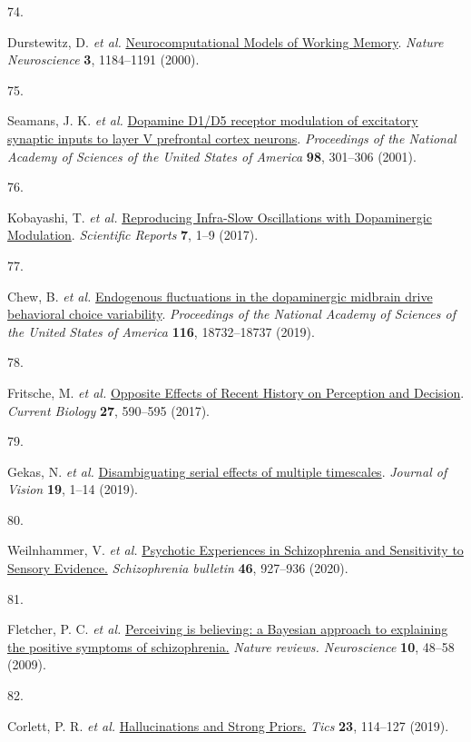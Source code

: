\documentclass[
]{article}
\newlength{\cslhangindent}
\newlength{\csllabelwidth}
\newlength{\cslentryspacingunit} %
\newenvironment{CSLReferences}[2] %
 {%
  \setlength{\parindent}{0pt}
  \ifodd #1
  \let\oldpar\par
  \def\par{\hangindent=\cslhangindent\oldpar}
  \fi
  \setlength{\parskip}{#2\cslentryspacingunit}
 }%
 {}
\newcommand{\CSLLeftMargin}[1]{\parbox[t]{\csllabelwidth}{#1}}
\newcommand{\CSLRightInline}[1]{\parbox[t]{\linewidth - \csllabelwidth}{#1}\break}
\begin{document}
\begin{CSLReferences}{0}{0}
\leavevmode{}%
\CSLLeftMargin{74. }%
\CSLRightInline{Durstewitz, D. \emph{et al.}
\href{https://doi.org/10.1038/81460}{{Neurocomputational Models of
Working Memory}}. \emph{Nature Neuroscience} \textbf{3}, 1184--1191
(2000).}

\leavevmode{}%
\CSLLeftMargin{75. }%
\CSLRightInline{Seamans, J. K. \emph{et al.}
\href{https://doi.org/10.1073/pnas.98.1.301}{{Dopamine D1/D5 receptor
modulation of excitatory synaptic inputs to layer V prefrontal cortex
neurons}}. \emph{Proceedings of the National Academy of Sciences of the
United States of America} \textbf{98}, 301--306 (2001).}

\leavevmode{}%
\CSLLeftMargin{76. }%
\CSLRightInline{Kobayashi, T. \emph{et al.}
\href{https://doi.org/10.1038/s41598-017-02366-z}{{Reproducing
Infra-Slow Oscillations with Dopaminergic Modulation}}. \emph{Scientific
Reports} \textbf{7}, 1--9 (2017).}

\leavevmode{}%
\CSLLeftMargin{77. }%
\CSLRightInline{Chew, B. \emph{et al.}
\href{https://doi.org/10.1073/pnas.1900872116}{{Endogenous fluctuations
in the dopaminergic midbrain drive behavioral choice variability}}.
\emph{Proceedings of the National Academy of Sciences of the United
States of America} \textbf{116}, 18732--18737 (2019).}

\leavevmode{}%
\CSLLeftMargin{78. }%
\CSLRightInline{Fritsche, M. \emph{et al.}
\href{https://doi.org/10.1016/j.cub.2017.01.006}{{Opposite Effects of
Recent History on Perception and Decision}}. \emph{Current Biology}
\textbf{27}, 590--595 (2017).}

\leavevmode{}%
\CSLLeftMargin{79. }%
\CSLRightInline{Gekas, N. \emph{et al.}
\href{https://doi.org/10.1167/19.6.24}{{Disambiguating serial effects of
multiple timescales}}. \emph{Journal of Vision} \textbf{19}, 1--14
(2019).}

\leavevmode{}%
\CSLLeftMargin{80. }%
\CSLRightInline{Weilnhammer, V. \emph{et al.}
\href{https://www.ncbi.nlm.nih.gov/pubmed/32090246}{{Psychotic
Experiences in Schizophrenia and Sensitivity to Sensory Evidence.}}
\emph{Schizophrenia bulletin} \textbf{46}, 927--936 (2020).}

\leavevmode{}%
\CSLLeftMargin{81. }%
\CSLRightInline{Fletcher, P. C. \emph{et al.}
\href{https://doi.org/10.1038/nrn2536}{{Perceiving is believing: a
Bayesian approach to explaining the positive symptoms of
schizophrenia.}} \emph{Nature reviews. Neuroscience} \textbf{10}, 48--58
(2009).}

\leavevmode{}%
\CSLLeftMargin{82. }%
\CSLRightInline{Corlett, P. R. \emph{et al.}
\href{https://doi.org/10.1016/j.tics.2018.12.001}{{Hallucinations and
Strong Priors.}} \emph{Tics} \textbf{23}, 114--127 (2019).}

\end{CSLReferences}
\end{document}

